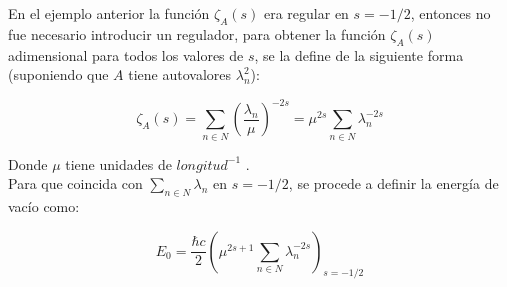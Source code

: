 En el ejemplo anterior la función $\zeta _A (s) $ era regular en $s= -1/2$, entonces no fue necesario introducir un regulador, para obtener la función $\zeta _A (s)$ adimensional para todos los valores de $s$, se la define de la siguiente forma (suponiendo que $A$ tiene autovalores $\lambda _n ^2 $):

\begin{equation}
\zeta _A (s) = \sum _{n \in N} \left( \frac{\lambda _n}{\mu }  \right) ^{-2s } = 
\mu ^{2s} \sum _{n \in N } \lambda _n ^{-2s}
\end{equation}

Donde $\mu $ tiene unidades de $longitud ^{-1}$ . \\

Para que coincida con $\underset{ {n \in N}}{  \sum } \lambda _n$ en $s= -1/2$, se procede a definir la energía de vacío como:

\begin{equation}
E _ 0 = 
\frac{\hbar c}{2 }
\left(
	\mu ^{2s+1} \sum _{n \in N} \lambda _n ^{-2s} 
	\right) _{s=-1/2}
\end{equation}